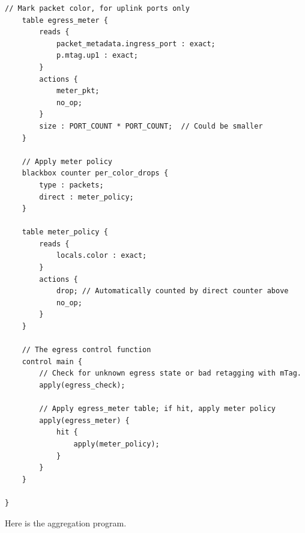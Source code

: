 \documentclass[12pt]{article}
\begin{document}
\begin{lstlisting}[style=P4style]
    // Mark packet color, for uplink ports only
    table egress_meter {
        reads {
            packet_metadata.ingress_port : exact;
            p.mtag.up1 : exact;
        }
        actions {
            meter_pkt;
            no_op;
        }
        size : PORT_COUNT * PORT_COUNT;  // Could be smaller
    }

    // Apply meter policy
    blackbox counter per_color_drops {
        type : packets;
        direct : meter_policy;
    }

    table meter_policy {
        reads {
            locals.color : exact;
        }
        actions {
            drop; // Automatically counted by direct counter above
            no_op;
        }
    }

    // The egress control function
    control main {
        // Check for unknown egress state or bad retagging with mTag.
        apply(egress_check);

        // Apply egress_meter table; if hit, apply meter policy
        apply(egress_meter) {
            hit {
                apply(meter_policy);
            }
        }
    }

}
\end{lstlisting}

Here is the aggregation program.
\end{document}
